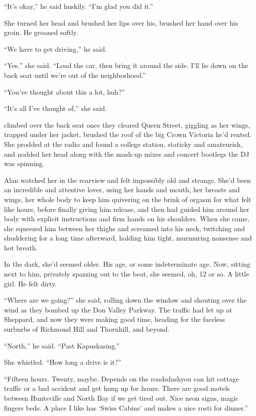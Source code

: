 ``It's okay,'' he said huskily.  ``I'm glad you did it.''

She turned her head and brushed her lips over his, brushed her hand
over his groin.  He groaned softly.

``We have to get driving,'' he said.

``Yes,'' she said.  ``Load the car, then bring it around the side. 
I'll lie down on the back seat until we're out of the neighborhood.''

``You've thought about this a lot, huh?''

``It's all I've thought of,'' she said.

 climbed over the back seat once they cleared Queen Street,
giggling as her wings, trapped under her jacket, brushed the roof of
the big Crown Victoria he'd rented.  She prodded at the radio and
found a college station, staticky and amateurish, and nodded her head
along with the mash-up mixes and concert bootlegs the DJ was spinning.

Alan watched her in the rearview and felt impossibly old and strange. 
She'd been an incredible and attentive lover, using her hands and
mouth, her breasts and wings, her whole body to keep him quivering on
the brink of orgasm for what felt like hours, before finally giving
him release, and then had guided him around her body with explicit
instructions and firm hands on his shoulders.  When she came, she
squeezed him between her thighs and screamed into his neck, twitching
and shuddering for a long time afterward, holding him tight, murmuring
nonsense and hot breath.

In the dark, she'd seemed older.  His age, or some indeterminate age. 
Now, sitting next to him, privately spazzing out to the beat, she
seemed, oh, 12 or so.  A little girl.  He felt dirty.

``Where are we going?'' she said, rolling down the window and shouting
over the wind as they bombed up the Don Valley Parkway.  The traffic
had let up at Sheppard, and now they were making good time, heading
for the faceless surburbs of Richmond Hill and Thornhill, and beyond.

``North,'' he said.  ``Past Kapuskasing.''

She whistled.  ``How long a drive is it?''

``Fifteen hours.  Twenty, maybe.  Depends on the roadsdash{}you can hit
cottage traffic or a bad accident and get hung up for hours.  There
are good motels between Huntsville and North Bay if we get tired out. 
Nice neon signs, magic fingers beds.  A place I like has `Swiss
Cabins' and makes a nice rosti for dinner.''

